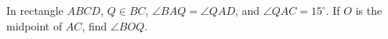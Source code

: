 In rectangle $ABCD$, $Q\in BC$, $\angle BAQ=\angle QAD$, and $\angle QAC=15^\circ$. If $O$ is the midpoint of $AC$, find $\angle BOQ$.
